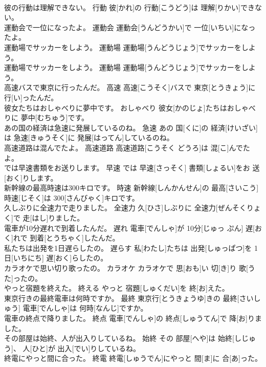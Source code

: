 \documentclass[8pt]{extreport}
\begin{document}
\begin{CJK}{UTF8}{min}
\\	彼の行動は理解できない。	行動	彼[かれ]の 行動[こうどう]は 理解[りかい]できない。	
\\	運動会で一位になったよ。	運動会	運動会[うんどうかい]で 一位[いちい]になったよ。	
\\	運動場でサッカーをしよう。	運動場	運動場[うんどうじょう]でサッカーをしよう。	
\\	運動場でサッカーをしよう。	運動場	運動場[うんどうじょう]でサッカーをしよう。	
\\	高速バスで東京に行ったんだ。	高速	高速[こうそく]バスで 東京[とうきょう]に 行[い]ったんだ。	
\\	彼女たちはおしゃべりに夢中です。	おしゃべり	彼女[かのじょ]たちはおしゃべりに 夢中[むちゅう]です。	
\\	あの国の経済は急速に発展しているのね。	急速	あの 国[くに]の 経済[けいざい]は 急速[きゅうそく]に 発展[はってん]しているのね。	
\\	高速道路は混んでたよ。	高速道路	高速道路[こうそく どうろ]は 混[こ]んでたよ。	
\\	では早速書類をお送りします。	早速	では 早速[さっそく] 書類[しょるい]をお 送[おく]りします。	
\\	新幹線の最高時速は300キロです。	時速	新幹線[しんかんせん]の 最高[さいこう] 時速[じそく]は 300[さんびゃく]キロです。	
\\	久しぶりに全速力で走りました。	全速力	久[ひさ]しぶりに 全速力[ぜんそくりょく]で 走[はし]りました。	
\\	電車が10分遅れで到着したんだ。	遅れ	電車[でんしゃ]が 10分[じゅっ ぷん] 遅[おく]れで 到着[とうちゃく]したんだ。	
\\	私たちは出発を1日遅らしたの。	遅らす	私[わたし]たちは 出発[しゅっぱつ]を 1日[いちにち] 遅[おく]らしたの。	
\\	カラオケで思い切り歌ったの。	カラオケ	カラオケで 思[おも]い 切[き]り 歌[うた]ったの。	
\\	やっと宿題を終えた。	終える	やっと 宿題[しゅくだい]を 終[お]えた。	
\\	東京行きの最終電車は何時ですか。	最終	東京行[とうきょうゆ]きの 最終[さいしゅう] 電車[でんしゃ]は 何時[なんじ]ですか。	
\\	電車の終点で降りました。	終点	電車[でんしゃ]の 終点[しゅうてん]で 降[お]りました。	
\\	その部屋は始終、人が出入りしているね。	始終	その 部屋[へや]は 始終[しじゅう]、 人[ひと]が 出入[でい]りしているね。	
\\	終電にやっと間に合った。	終電	終電[しゅうでん]にやっと 間[ま]に 合[あ]った。	

\end{CJK}
\end{document}
